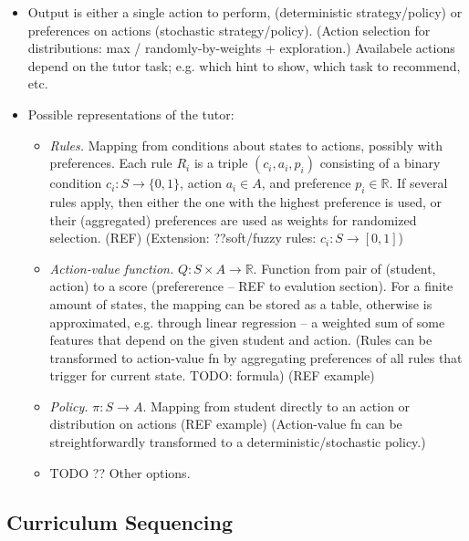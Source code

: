 \begin{itemize}
\item Output is either a single action to perform,
  (deterministic strategy/policy)
  or preferences on actions (stochastic strategy/policy).
  (Action selection for distributions: max / randomly-by-weights +
  exploration.)
  Availabele actions depend on the tutor task;
  e.g. which hint to show, which task to recommend, etc.
\item Possible representations of the tutor:
\begin{itemize}
\item \emph{Rules.}
  Mapping from conditions about states to actions, possibly with preferences.
  Each rule $R_i$ is a triple $(c_i, a_i, p_i)$
  consisting of a binary condition $c_i: S \rightarrow \{0, 1\}$,
  action $a_i \in A$, and preference $p_i \in \mathbb{R}$.
  If several rules apply, then either the one with the highest preference is used,
  or their (aggregated) preferences are used as weights for randomized selection.
  (REF)
  (Extension: ??soft/fuzzy rules: $c_i: S\rightarrow [0, 1]$)
\item \emph{Action-value function.}  %
  $Q: S \times A \rightarrow \mathbb{R}$.
  Function from pair of (student, action) to a score
  (prefererence -- REF to evalution section).
  For a finite amount of states, the mapping can be stored as a table,
  otherwise is approximated, e.g. through linear regression -- a weighted sum
  of some features that depend on the given student and action.
  (Rules can be transformed to action-value fn by aggregating preferences of
  all rules that trigger for current state. TODO: formula)
  (REF example)
\item \emph{Policy.}  %
  $\pi: S \rightarrow A$.
  Mapping from student directly to an action or distribution on actions
  (REF example)
  (Action-value fn can be streightforwardly transformed to a
  deterministic/stochastic policy.)
\item TODO ?? Other options.
\end{itemize}
\end{itemize}


\subsection{Curriculum Sequencing}

